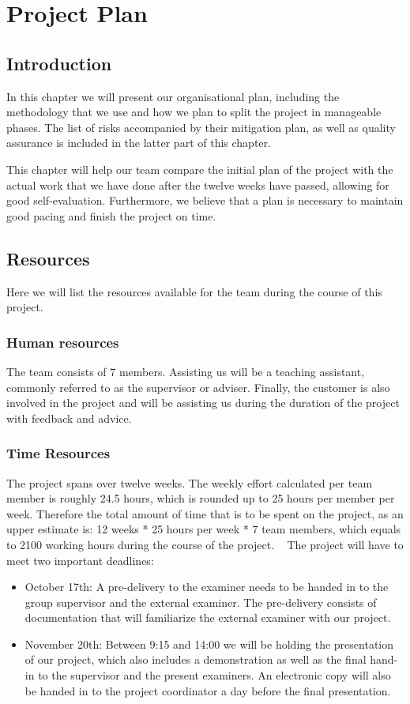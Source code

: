 \documentclass[../document.tex]{subfiles}
\begin{document}
\section{Project Plan}
\subsection{Introduction}
In this chapter we will present our organisational plan, including the methodology that we use and how we plan to split the project in manageable phases. The list of risks accompanied by their mitigation plan, as well as quality assurance is included in the latter part of this chapter.

This chapter will help our team compare the initial plan of the project with the actual work that we have done after the twelve weeks have passed, allowing for good self-evaluation. Furthermore, we believe that a plan is necessary to maintain good pacing and finish the project on time.

\subsection{Resources}
Here we will list the resources available for the team during the course of this project.

\subsubsection{Human resources}
The team consists of 7 members. Assisting us will be a teaching assistant, commonly referred to as the supervisor or adviser. Finally, the customer is also involved in the project and will be assisting us during the duration of the project with feedback and advice.

\subsubsection{Time Resources}
The project spans over twelve weeks. The weekly effort calculated per team member is roughly 24.5 hours, which is rounded up to 25 hours per member per week. Therefore the total amount of time that is to be spent on the project, as an upper estimate is: 12 weeks * 25 hours per week * 7 team members, which equals to 2100 working hours during the course of the project.
\newline \ \newline
The project will have to meet two important deadlines:
\begin{itemize}
\item
October 17th: A pre-delivery to the examiner needs to be handed in to the group supervisor and the external examiner. The pre-delivery consists of documentation that will familiarize the external examiner with our project.
\item
November 20th: Between 9:15 and 14:00 we will be holding the presentation of our project, which also includes a demonstration as well as the final hand-in to the supervisor and the present examiners. An electronic copy will also be handed in to the project coordinator a day before the final presentation.
\end{itemize}
\end{document}
